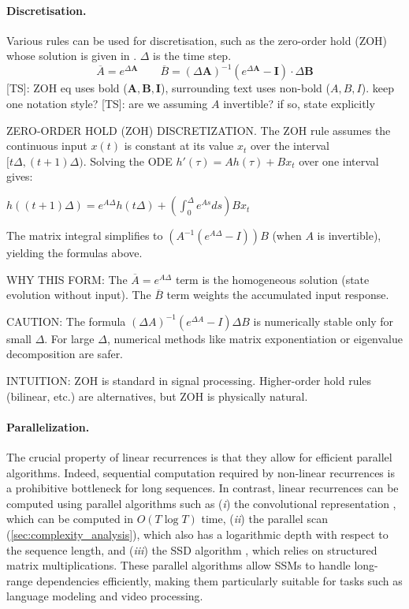 \documentclass{article}
\newcommand{\TS}[1]{{\color{pink}[TS]: #1}}
\begin{document}
\paragraph{Discretisation.} Various rules can be used for discretisation, such as the zero-order hold (ZOH) whose solution is given in . $\Delta$ is the time step.
\begin{equation}
\label{eq:zoh}
\overline{A} = e^{\Delta \bm{A}}
\qquad
\overline{B} = (\Delta \bm{A})^{-1} (e^{\Delta \bm{A}} - \bm{I}) \cdot \Delta \bm{B}
\end{equation}
\TS{ZOH eq uses bold ($\bm A,\bm B,\bm I$), surrounding text uses non-bold ($A,B,I$). keep one notation style?}
\TS{are we assuming $A$ invertible? if so, state explicitly}

\begin{thomasbox}
ZERO-ORDER HOLD (ZOH) DISCRETIZATION. The ZOH rule assumes the continuous input $x(t)$ is constant at its value $x_t$ over the interval $[t\Delta, (t+1)\Delta)$. Solving the ODE $h'(\tau) = Ah(\tau) + Bx_t$ over one interval gives:

$h((t+1)\Delta) = e^{A\Delta} h(t\Delta) + \left(\int_0^{\Delta} e^{As} ds\right) B x_t$

The matrix integral simplifies to $(A^{-1}(e^{A\Delta} - I)) B$ (when $A$ is invertible), yielding the formulas above.

WHY THIS FORM: The $\overline{A} = e^{A\Delta}$ term is the homogeneous solution (state evolution without input). The $\overline{B}$ term weights the accumulated input response.

CAUTION: The formula $(\Delta A)^{-1}(e^{\Delta A} - I) \Delta B$ is numerically stable only for small $\Delta$. For large $\Delta$, numerical methods like matrix exponentiation or eigenvalue decomposition are safer.

INTUITION: ZOH is standard in signal processing. Higher-order hold rules (bilinear, etc.) are alternatives, but ZOH is physically natural.
\end{thomasbox}

\paragraph{Parallelization.} The crucial property of linear recurrences is that they allow for efficient parallel algorithms. Indeed, sequential computation required by non-linear recurrences is a prohibitive bottleneck for long sequences. In contrast, linear recurrences can be computed using parallel algorithms such as
%
(\emph{i}) the convolutional representation \citep{gu2021efficiently}, which can be computed in $O(T \log T)$ time,
%
(\emph{ii}) the parallel scan (\cref{sec:complexity_analysis}), which also has a logarithmic depth with respect to the sequence length, and
%
(\emph{iii}) the SSD algorithm \citep{TODO}, which relies on structured matrix multiplications.
%
These parallel algorithms allow SSMs to handle long-range dependencies efficiently, making them particularly suitable for tasks such as language modeling and video processing.
\end{document}
